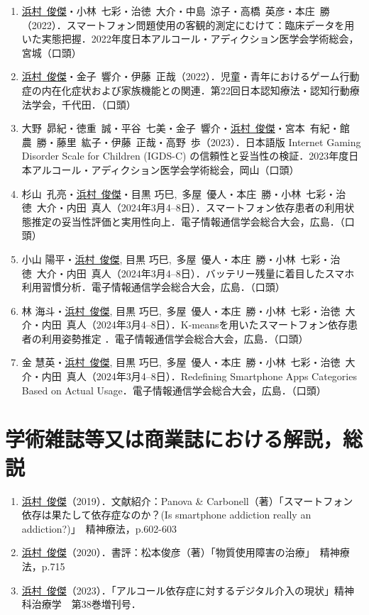 \documentclass[11pt,a4paper]{article}
\begin{document}
\begin{enumerate}
	\item \underline{浜村\ 俊傑}・小林\ 七彩・治徳\ 大介・中島\ 涼子・高橋\ 英彦・本庄\ 勝（2022）．スマートフォン問題使用の客観的測定にむけて：臨床データを用いた実態把握．2022年度日本アルコール・アディクション医学会学術総会，宮城（口頭）
	\item \underline{浜村\ 俊傑}・金子\ 響介・伊藤\ 正哉（2022）．児童・青年におけるゲーム行動症の内在化症状および家族機能との関連．第22回日本認知療法・認知行動療法学会，千代田．（口頭）
	\item 大野\ 昴紀・徳重\ 誠・平谷\ 七美・金子\ 響介・\underline{浜村\ 俊傑}・宮本\ 有紀・館農\ 勝・藤里\ 紘子・伊藤\ 正哉・高野\ 歩（2023）．日本語版 Internet Gaming Disorder Scale for Children (IGDS-C) の信頼性と妥当性の検証．2023年度日本アルコール・アディクション医学会学術総会，岡山（口頭）
	\item 杉山\ 孔亮・\underline{浜村\ 俊傑}・目黒 巧巳,\ 多屋\ 優人・本庄\ 勝・小林\ 七彩・治徳\ 大介・内田\ 真人（2024年3月4--8日）．スマートフォン依存患者の利用状態推定の妥当性評価と実用性向上．電子情報通信学会総合大会，広島．（口頭）
	\item 小山 陽平・\underline{浜村\ 俊傑}, 目黒 巧巳,\ 多屋\ 優人・本庄\ 勝・小林\ 七彩・治徳\ 大介・内田\ 真人（2024年3月4--8日）．バッテリー残量に着目したスマホ利用習慣分析．電子情報通信学会総合大会，広島．（口頭）
	\item 林 海斗・\underline{浜村\ 俊傑}, 目黒 巧巳,\ 多屋\ 優人・本庄\ 勝・小林\ 七彩・治徳\ 大介・内田\ 真人（2024年3月4--8日）．K-meansを用いたスマートフォン依存患者の利用姿勢推定 ．電子情報通信学会総合大会，広島．（口頭）
	\item 金 慧英・\underline{浜村\ 俊傑}, 目黒 巧巳,\ 多屋\ 優人・本庄\ 勝・小林\ 七彩・治徳\ 大介・内田\ 真人（2024年3月4--8日）．Redefining Smartphone Apps Categories Based on Actual Usage．電子情報通信学会総合大会，広島．（口頭）
\end{enumerate}

\section{学術雑誌等又は商業誌における解説，総説}
\begin{enumerate}
	\item \underline{浜村\ 俊傑}（2019）．文献紹介：Panova \& Carbonell（著）「スマートフォン依存は果たして依存症なのか？(Is smartphone addiction really an addiction?)」\ 精神療法，p.602-603
	\item \underline{浜村\ 俊傑}（2020）．書評：松本俊彦（著）「物質使用障害の治療」\ 精神療法，p.715
	\item \underline{浜村\ 俊傑}（2023）．「アルコール依存症に対するデジタル介入の現状」精神科治療学　第38巻増刊号．
\end{enumerate}
\end{document}
